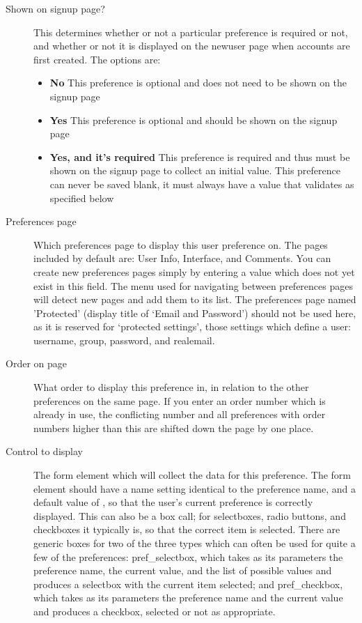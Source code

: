\begin{description}
\item[Shown on signup page?] This determines whether or not a particular preference is required or not, and whether or not it is displayed on the newuser page when accounts are first created. The options are:
\begin{itemize}
\item {\bf No} This preference is optional and does not need to be shown on the signup page
\item {\bf Yes} This preference is optional and should be shown on the signup page
\item {\bf Yes, and it's required} This preference is required and thus must be shown on the signup page to collect an initial value. This preference can never be saved blank, it must always have a value that validates as specified below
\end{itemize}
\item[Preferences page] Which preferences page to display this user preference on. The pages included by default are: User Info, Interface, and Comments. You can create new preferences pages simply by entering a value which does not yet exist in this field. The menu used for navigating between preferences pages will detect new pages and add them to its list. The preferences page named 'Protected' (display title of `Email and Password') should not be used here, as it is reserved for `protected settings', those settings which define a user: username, group, password, and realemail.
\item[Order on page] What order to display this preference in, in relation to the other preferences on the same page. If you enter an order number which is already in use, the conflicting number and all preferences with order numbers higher than this are shifted down the page by one place.
\item[Control to display] The form element which will collect the data for this preference. The form element should have a name setting identical to the preference name, and a default value of , so that the user's current preference is correctly displayed. This can also be a box call; for selectboxes, radio buttons, and checkboxes it typically is, so that the correct item is selected. There are generic boxes for two of the three types which can often be used for quite a few of the preferences: pref\_selectbox, which takes as its parameters the preference name, the current value, and the list of possible values and produces a selectbox with the current item selected; and pref\_checkbox, which takes as its parameters the preference name and the current value and produces a checkbox, selected or not as appropriate.

\end{description}
